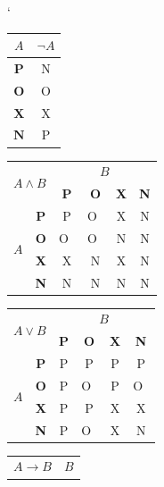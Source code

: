 \documentclass[11pt,a4paper]{article}
\begin{document}
\begin{table}[ht] 
	\catcode` 	
	\begin{center}	
		\begin{tabular}{|c|c|}            \hline
			$A$ & $\neg A$\\ 			  \hline
			$\textbf{P}$ & N\\ \hline
			$\textbf{O}$ & O\\ \hline
			$\textbf{X}$ & X\\ \hline
			$\textbf{N}$ & P\\
			\hline
		\end{tabular}
		\begin{tabular}{|c|c|c|c|c|c|} \hline
			\multicolumn{2}{|l|}{\multirow{2}{*}{$A \wedge B$}} 
				& \multicolumn{4}{c|}{$B$}  \\ \cline{3-6} 
				\multicolumn{2}{|c|}{} 
					& \textbf{P} & \textbf{O} & \textbf{X} & \textbf{N} \\ \hline
					\multirow{4}{*}{$A$}
						& \textbf{P} & P & O~& X & N \\ \cline{2-6} 
						& \textbf{O} & O~& O~& N & N \\ \cline{2-6}  
 						& \textbf{X} & X & N & X & N \\ \cline{2-6} 
 						& \textbf{N} & N & N & N & N \\ \hline 
		\end{tabular}
		\begin{tabular}{|c|c|c|c|c|c|} \hline
			\multicolumn{2}{|l|}{\multirow{2}{*}{$A \vee B$}} 
				& \multicolumn{4}{c|}{$B$}  \\ \cline{3-6} 
				\multicolumn{2}{|c|}{} 
					& \textbf{P} & \textbf{O} & \textbf{X} & \textbf{N} \\ \hline
					\multirow{4}{*}{$A$} 
						& \textbf{P} & P & P & P & P \\ \cline{2-6} 
 						& \textbf{O} & P & O~& P & O~\\ \cline{2-6}  
 						& \textbf{X} & P & P & X & X \\ \cline{2-6} 
 						& \textbf{N} & P & O~& X & N \\ \hline 
	 	\end{tabular}
		\begin{tabular}{|c|c|c|c|c|c|} \hline
			\multicolumn{2}{|l|}{\multirow{2}{*}{$A \rightarrow B$}} 
				& \multicolumn{4}{c|}{$B$}  \\ \cline{3-6} 

\end{tabular}
\end{center}
\end{table}
\end{document}
